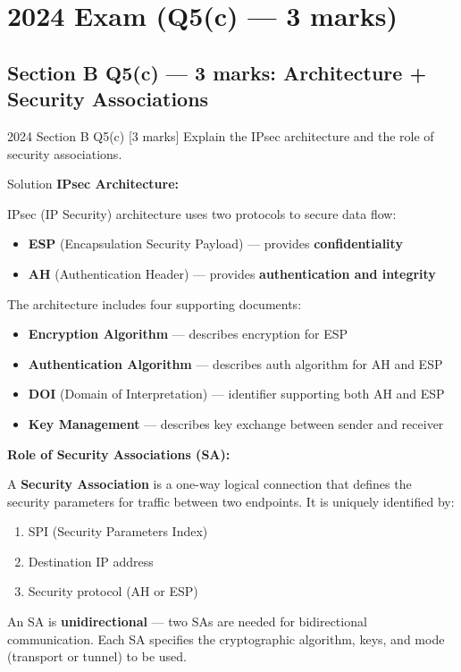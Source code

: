 \documentclass[12pt,a4paper]{article}
\begin{document}
\vspace{1em}

\section{2024 Exam (Q5(c) --- 3 marks)}

\subsection{Section B Q5(c) --- 3 marks: Architecture + Security Associations}

\begin{qbox}{2024 Section B Q5(c) [3 marks]}
  Explain the IPsec architecture and the role of security associations.
\end{qbox}

\begin{solbox}{Solution}
\textbf{IPsec Architecture:}

IPsec (IP Security) architecture uses two protocols to secure data flow:
\begin{itemize}[nosep]
  \item \textbf{ESP} (Encapsulation Security Payload) --- provides \textbf{confidentiality}
  \item \textbf{AH} (Authentication Header) --- provides \textbf{authentication and integrity}
\end{itemize}

The architecture includes four supporting documents:
\begin{itemize}[nosep]
  \item \textbf{Encryption Algorithm} --- describes encryption for ESP
  \item \textbf{Authentication Algorithm} --- describes auth algorithm for AH and ESP
  \item \textbf{DOI} (Domain of Interpretation) --- identifier supporting both AH and ESP
  \item \textbf{Key Management} --- describes key exchange between sender and receiver
\end{itemize}

\bigskip
\textbf{Role of Security Associations (SA):}

A \textbf{Security Association} is a one-way logical connection that defines the security parameters for traffic between two endpoints. It is uniquely identified by:
\begin{enumerate}[nosep]
  \item SPI (Security Parameters Index)
  \item Destination IP address
  \item Security protocol (AH or ESP)
\end{enumerate}

An SA is \textbf{unidirectional} --- two SAs are needed for bidirectional communication. Each SA specifies the cryptographic algorithm, keys, and mode (transport or tunnel) to be used.
\end{solbox}
\end{document}
